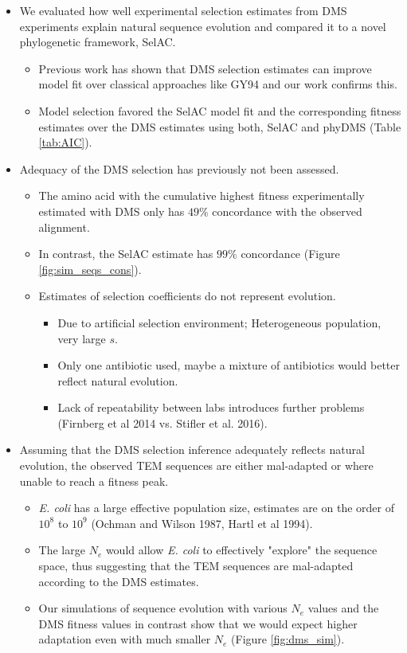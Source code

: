 \documentclass[12pt]{article}
\begin{document}
\begin{itemize}
	\item We evaluated how well experimental selection estimates from DMS experiments explain natural sequence evolution and compared it to a novel phylogenetic framework, SelAC.
	\begin{itemize}
		\item Previous work has shown that DMS selection estimates can improve model fit over classical approaches like GY94 and our work confirms this.
		\item Model selection favored the SelAC model fit and the corresponding fitness estimates over the DMS estimates using both, SelAC and phyDMS (Table \ref{tab:AIC}).
	\end{itemize}

	\item Adequacy of the DMS selection has previously not been assessed.
	\begin{itemize}
		\item The amino acid with the cumulative highest fitness experimentally estimated with DMS only has $49 \%$ concordance with the observed alignment.
		\item In contrast, the SelAC estimate has $99 \%$ concordance (Figure \ref{fig:sim_seqs_cons}). 
		\item Estimates of selection coefficients do not represent evolution.
 		\begin{itemize}
			\item Due to artificial selection environment; Heterogeneous population, very large $s$. 
			\item Only one antibiotic used, maybe a mixture of antibiotics would better reflect natural evolution.
			\item Lack of repeatability between labs introduces further problems (Firnberg et al 2014 vs. Stifler et al. 2016).
		\end{itemize}
	\end{itemize}

	\item Assuming that the DMS selection inference adequately reflects natural evolution, the observed TEM sequences are either mal-adapted or where unable to reach a fitness peak.
	\begin{itemize}
		\item \textit{E. coli} has a large effective population size, estimates are on the order of $10^8$ to $10^9$ (Ochman and Wilson 1987, Hartl et al 1994).
		\item The large $N_e$ would allow \textit{E. coli} to effectively "explore" the sequence space, thus suggesting that the TEM sequences are mal-adapted according to the DMS estimates.
		\item Our simulations of sequence evolution with various $N_e$ values and the DMS fitness values in contrast show that we would expect higher adaptation even with much smaller $N_e$ (Figure \ref{fig:dms_sim}).
	\end{itemize}


\end{itemize}
\end{document}
